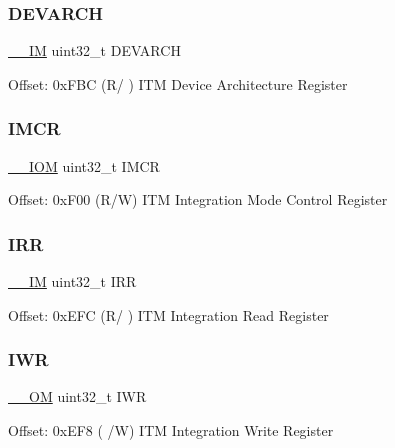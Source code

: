 \subsubsection{\texorpdfstring{D\+E\+V\+A\+R\+CH}{DEVARCH}}
{\footnotesize\ttfamily \mbox{\hyperlink{core__cm4_8h_a4cc1649793116d7c2d8afce7a4ffce43}{\+\_\+\+\_\+\+IM}} uint32\+\_\+t D\+E\+V\+A\+R\+CH}

Offset\+: 0x\+F\+BC (R/ ) I\+TM Device Architecture Register \mbox{\label{struct_i_t_m___type_af0446ee5dcb6082dc8bba9adcc8ec812}} 
\subsubsection{\texorpdfstring{I\+M\+CR}{IMCR}}
{\footnotesize\ttfamily \mbox{\hyperlink{core__cm4_8h_ab6caba5853a60a17e8e04499b52bf691}{\+\_\+\+\_\+\+I\+OM}} uint32\+\_\+t I\+M\+CR}

Offset\+: 0x\+F00 (R/W) I\+TM Integration Mode Control Register \mbox{\label{struct_i_t_m___type_ae300b6ee4d883ceec8f3572fc0fc3d69}} 
\subsubsection{\texorpdfstring{I\+RR}{IRR}}
{\footnotesize\ttfamily \mbox{\hyperlink{core__cm4_8h_a4cc1649793116d7c2d8afce7a4ffce43}{\+\_\+\+\_\+\+IM}} uint32\+\_\+t I\+RR}

Offset\+: 0x\+E\+FC (R/ ) I\+TM Integration Read Register \mbox{\label{struct_i_t_m___type_a68e56eb5e16d2aa293b0bec5c99e50fe}} 
\subsubsection{\texorpdfstring{I\+WR}{IWR}}
{\footnotesize\ttfamily \mbox{\hyperlink{core__cm4_8h_a0ea2009ed8fd9ef35b48708280fdb758}{\+\_\+\+\_\+\+OM}} uint32\+\_\+t I\+WR}

Offset\+: 0x\+E\+F8 ( /W) I\+TM Integration Write Register \mbox{\label{struct_i_t_m___type_acc9e51f871c357a9094105435b150d13}} 
